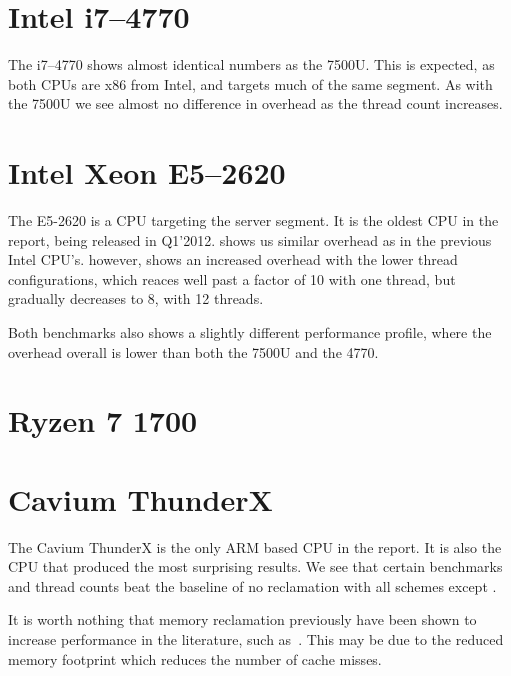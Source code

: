 \documentclass[b5paper]{report}
\begin{document}

\clearpage
\section{Intel\textregistered{} i7--4770}

The i7--4770 shows almost identical numbers as the 7500U. This is expected, as
both CPUs are x86 from Intel, and targets much of the same segment. As with the
7500U we see almost no difference in overhead as the thread count increases.


\clearpage
\section{Intel\textregistered{} Xeon\textregistered{} E5--2620}

The E5-2620 is a CPU targeting the server segment. It is the oldest CPU in the
report, being released in Q1'2012.  shows us similar overhead as in
the previous Intel CPU's.  however, shows an increased overhead
with the lower thread configurations, which reaces well past a factor of 10 with
one thread, but gradually decreases to 8, with 12 threads.

Both  benchmarks also shows a slightly different performance profile,
where the overhead overall is lower than both the 7500U and the 4770.



\clearpage
\section{Ryzen 7 1700}

\clearpage
\section{Cavium ThunderX}

The Cavium ThunderX is the only ARM based CPU in the report. It is also the CPU
that produced the most surprising results. We see that certain benchmarks and
thread counts beat the baseline of no reclamation with all schemes except
. 

It is worth nothing that memory reclamation previously have been shown to
increase performance in the literature, such as\ \cite{brown2015reclaiming}.
This may be due to the reduced memory footprint which reduces the number of
cache misses.
\end{document}
